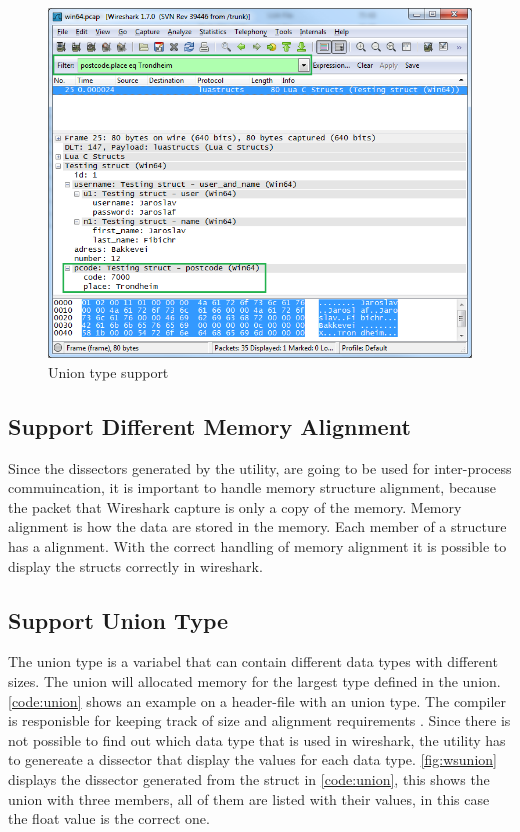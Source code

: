 \begin{figure}[ht]
	\center
	\includegraphics[width=\textwidth]{./sprints/img/wireshark_filter}
	\caption{Union type support\label{fig:wsfilter}}
\end{figure}

\subsection{Support Different Memory Alignment}
Since the dissectors generated by the utility, are going to be used for 
inter-process commuincation, it is important to handle memory structure 
alignment, because the packet that Wireshark capture is only a copy of the 
memory. Memory alignment is how the data are stored in the memory. Each member 
of a structure has a alignment. With the correct handling of memory alignment it is 
possible to display the structs correctly in wireshark.

\subsection{Support Union Type}
The \gls{union} type is a variabel that can contain different data types with 
different sizes. The \gls{union} will allocated memory for the largest type defined 
in the \gls{union}. \autoref{code:union} shows an example on a header-file with an 
\gls{union} type. The compiler is responisble for keeping track of size and 
alignment requirements\cite[p.147]{Kerninghan1988} . Since there is not 
possible to find out which data type that is used in \Gls{wireshark}, the \gls{utility} 
has to genereate a \gls{dissector} that display the values for each data type. 
\autoref{fig:wsunion} displays the \gls{dissector} generated from the struct in 
\autoref{code:union}, this shows the \gls{union} with three members, all of them are 
listed with their values, in this case the float value is the correct one.

